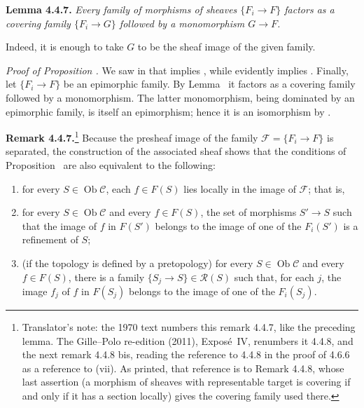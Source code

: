 

\medskip
\noindent{}\textbf{Lemma 4.4.7.}
\textit{Every family of morphisms of sheaves \(\{F_i\to F\}\) factors as a
covering family \(\{F_i\to G\}\) followed by a monomorphism \(G\to F\).}

Indeed, it is enough to take \(G\) to be the sheaf image of the given family.

\medskip
\noindent\textit{Proof of Proposition .}
We saw in  that  implies , while  evidently implies .
Finally, let \(\{F_i\to F\}\) be an epimorphic family. By Lemma~ it
factors as a covering family followed by a monomorphism. The latter
monomorphism, being dominated
by an epimorphic family, is itself an epimorphism; hence it is an isomorphism
by .

\medskip
\noindent{}\textbf{Remark 4.4.7.}\footnote{Translator's note: the 1970 text numbers this remark
4.4.7, like the preceding lemma. The Gille--Polo re-edition (2011),
Expos\'e~IV, renumbers it 4.4.8, and the next remark 4.4.8 bis, reading the
reference to 4.4.8 in the proof of 4.6.6 as a reference to (vii). As printed,
that reference is to Remark 4.4.8, whose last assertion (a morphism of sheaves
with representable target is covering if and only if it has a section
locally) gives the covering family used there.}
Because the presheaf image of the family
\(\mathscr F=\{F_i\to F\}\) is separated, the construction of the associated
sheaf shows that the conditions of Proposition~ are also equivalent to
the following:
\begin{enumerate}
  \item[(v)] for every \(S\in\operatorname{Ob}\mathscr C\), each
    \(f\in F(S)\) lies locally in the image of \(\mathscr F\); that is,

  \item[(vi)] for every \(S\in\operatorname{Ob}\mathscr C\) and every
    \(f\in F(S)\), the set of morphisms \(S'\to S\) such that the image of
    \(f\) in \(F(S')\) belongs to the image of one of the \(F_i(S')\) is a
    refinement of \(S\);

  \item[(vii)] (if the topology is defined by a pretopology) for every
    \(S\in\operatorname{Ob}\mathscr C\) and every \(f\in F(S)\), there is a
    family \(\{S_j\to S\}\in\mathscr R(S)\) such that, for each \(j\), the
    image \(f_j\) of \(f\) in \(F(S_j)\) belongs to the image of one of the
    \(F_i(S_j)\).
\end{enumerate}

